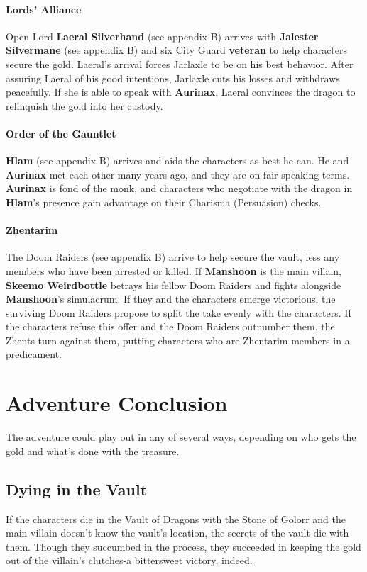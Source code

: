 \documentclass[10pt,a4paper,twoside,twocolumn,openany,nodeprecatedcode]{dndbook}
\begin{document}
\paragraph{Lords' Alliance}
Open Lord \textbf{Laeral Silverhand} (see appendix B) arrives with \textbf{Jalester Silvermane} (see appendix B) and six City Guard \textbf{veteran} to help characters secure the gold. Laeral's arrival forces Jarlaxle to be on his best behavior. After assuring Laeral of his good intentions, Jarlaxle cuts his losses and withdraws peacefully. If she is able to speak with \textbf{Aurinax}, Laeral convinces the dragon to relinquish the gold into her custody.
\paragraph{Order of the Gauntlet}
\textbf{Hlam} (see appendix B) arrives and aids the characters as best he can. He and \textbf{Aurinax} met each other many years ago, and they are on fair speaking terms. \textbf{Aurinax} is fond of the monk, and characters who negotiate with the dragon in \textbf{Hlam}'s presence gain advantage on their Charisma (Persuasion) checks.
\paragraph{Zhentarim}
The Doom Raiders (see appendix B) arrive to help secure the vault, less any members who have been arrested or killed. If \textbf{Manshoon} is the main villain, \textbf{Skeemo Weirdbottle} betrays his fellow Doom Raiders and fights alongside \textbf{Manshoon}'s simulacrum. If they and the characters emerge victorious, the surviving Doom Raiders propose to split the take evenly with the characters. If the characters refuse this offer and the Doom Raiders outnumber them, the Zhents turn against them, putting characters who are Zhentarim members in a predicament.
\section{Adventure Conclusion}
The adventure could play out in any of several ways, depending on who gets the gold and what's done with the treasure.
\subsection{Dying in the Vault}
If the characters die in the Vault of Dragons with the Stone of Golorr and the main villain doesn't know the vault's location, the secrets of the vault die with them. Though they succumbed in the process, they succeeded in keeping the gold out of the villain's clutches-a bittersweet victory, indeed.
\end{document}
